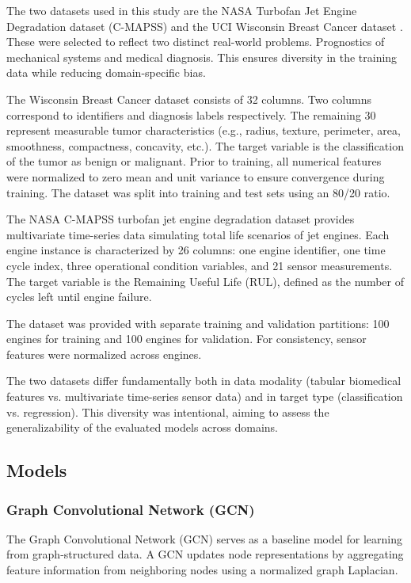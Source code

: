 \documentclass[12pt]{article}
\begin{document}
The two datasets used in this study are the NASA Turbofan Jet Engine Degradation dataset (C-MAPSS) and the UCI Wisconsin Breast Cancer dataset . These were selected to reflect two distinct real-world problems. Prognostics of mechanical systems and medical diagnosis. This ensures diversity in the training data while reducing domain-specific bias.

The Wisconsin Breast Cancer dataset consists of 32 columns. Two columns correspond to identifiers and diagnosis labels respectively.
The remaining 30 represent measurable tumor characteristics (e.g., radius, texture, perimeter, area, smoothness, compactness, concavity, etc.). The target variable is the classification of the tumor as benign or malignant.  
Prior to training, all numerical features were normalized to zero mean and unit variance to ensure convergence during training. The dataset was split into training and test sets using an 80/20 ratio.


The NASA C-MAPSS turbofan jet engine degradation dataset provides multivariate time-series data simulating total life scenarios of jet engines. Each engine instance is characterized by 26 columns: one engine identifier, one time cycle index, three operational condition variables, and 21 sensor measurements. The target variable is the Remaining Useful Life (RUL), defined as the number of cycles left until engine failure.  

The dataset was provided with separate training and validation partitions: 100 engines for training and 100 engines for validation. For consistency, sensor features were normalized across engines.


The two datasets differ fundamentally both in data modality (tabular biomedical features vs. multivariate time-series sensor data) and in target type (classification vs. regression). This diversity was intentional, aiming to assess the generalizability of the evaluated models across domains.  


\subsection{Models}  
\subsubsection{Graph Convolutional Network (GCN)}  
The Graph Convolutional Network (GCN) serves as a baseline model for learning from graph-structured data. A GCN updates node representations by aggregating feature information from neighboring nodes using a normalized graph Laplacian. 
\end{document}
